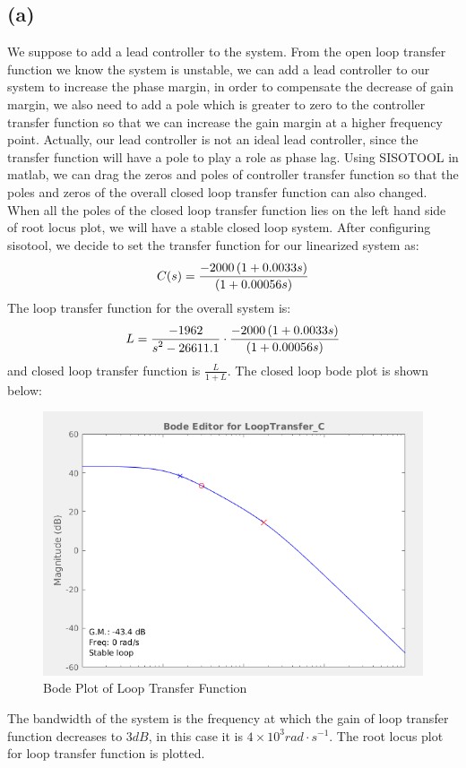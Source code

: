 \documentclass[letterpaper]{article}
\begin{document}
\subsection*{(a)}
We suppose to add a lead controller to the system. From the open loop transfer function we know the system is unstable, we can add a lead controller to our system to increase the phase margin, in order to compensate the decrease of gain margin, we also need to add a pole which is greater to zero to the controller transfer function so that we can increase the gain margin at a higher frequency point. Actually, our lead controller is not an ideal lead controller, since the transfer function will have a pole to play a role as phase lag. Using SISOTOOL in matlab, we can drag the zeros and poles of controller transfer function so that the poles and zeros of the overall closed loop transfer function can also changed. When all the poles of the closed loop transfer function lies on the left hand side of root locus plot, we will have a stable closed loop system. After configuring sisotool, we decide to set the transfer function for our linearized system as:
$$C(s) = \frac{\displaystyle -2000\left(1+0.0033s\right)}{\displaystyle \left(1+0.00056s\right)}$$
The loop transfer function for the overall system is:
$$L = \frac{\displaystyle -1962}{\displaystyle s^2 - 26611.1}\cdot\frac{\displaystyle -2000\left(1+0.0033s\right)}{\displaystyle \left(1+0.00056s\right)}$$
and closed loop transfer function is $\tfrac{L}{1+L}$. The closed loop bode plot is shown below:
\begin{figure}[H]
	\centering
	\includegraphics[scale=0.5]{bode_gain.png}
	\caption{Bode Plot of Loop Transfer Function}
\end{figure}
The bandwidth of the system is the frequency at which the gain of loop transfer function decreases to $3 dB$, in this case it is $4 \times 10^3 rad\cdot s^{-1}$. The root locus plot for loop transfer function is plotted.
\end{document}
